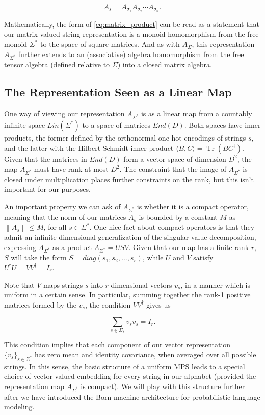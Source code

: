 \documentclass{article}
\DeclareMathOperator{\Tr}{Tr}
\begin{document}
\begin{equation}
\label{eq:matrix_product}
    A_s = A_{\sigma_1} A_{\sigma_2} \cdots A_{\sigma_n}.
\end{equation}

Mathematically, the form of \eqref{eq:matrix_product} can be read as a statement that our matrix-valued string representation is a monoid homomorphism from the free monoid $\Sigma^*$ to the space of square matrices. And as with $A_{\Sigma}$, this representation $A_{\Sigma^*}$ further extends to an (associative) algebra homomorphism from the free tensor algebra (defined relative to $\Sigma$) into a closed matrix algebra.

\subsection{The Representation Seen as a Linear Map}
One way of viewing our representation $A_{\Sigma^*}$ is as a linear map from a countably infinite space $Lin(\Sigma^*)$ to a space of matrices $End(D)$. Both spaces have inner products, the former defined by the orthonormal one-hot encodings of strings $s$, and the latter with the Hilbert-Schmidt inner product $\langle B, C\rangle = \Tr(B C^\dagger)$. Given that the matrices in $End(D)$ form a vector space of dimension $D^2$, the map $A_{\Sigma^*}$ must have rank at most $D^2$. The constraint that the image of $A_{\Sigma^*}$ is closed under multiplication places further constraints on the rank, but this isn't important for our purposes.

An important property we can ask of $A_{\Sigma^*}$ is whether it is a compact operator, meaning that the norm of our matrices $A_s$ is bounded by a constant $M$ as $\left\|A_s\right\| \leq M$, for all $s \in \Sigma^*$. One nice fact about compact operators is that they admit an infinite-dimensional generalization of the singular value decomposition, expressing $A_{\Sigma^*}$ as a product $A_{\Sigma^*} = U S V$. Given that our map has a finite rank $r$, $S$ will take the form $S = diag(s_1, s_2, \ldots, s_r)$, while $U$ and $V$ satisfy $U^\dagger U = V V^\dagger = I_r$. 

Note that $V$ maps strings $s$ into $r$-dimensional vectors $v_s$, in a manner which is uniform in a certain sense. In particular, summing together the rank-1 positive matrices formed by the $v_s$, the condition $V V^\dagger$ gives us

\begin{equation}
    \sum_{s\in \Sigma_*} v_s v_s^\dagger = I_r.
\end{equation}

This condition implies that each component of our vector representation $\{v_s\}_{s\in \Sigma^*}$ has zero mean and identity covariance, when averaged over all possible strings. In this sense, the basic structure of a uniform MPS leads to a special choice of vector-valued embedding for every string in our alphabet (provided the representation map $A_{\Sigma^*}$ is compact). We will play with this structure further after we have introduced the Born machine architecture for probabilistic language modeling.

\end{document}
